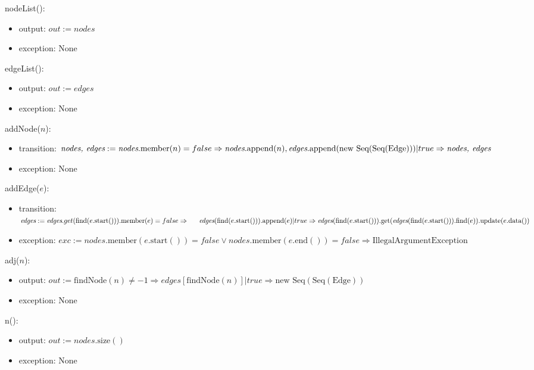 \documentclass[12pt]{article}
\begin{document}
\noindent nodeList():
\begin{itemize}
	\item output: $out := \textit{nodes}$
	\item exception: None
\end{itemize}

\noindent edgeList():
\begin{itemize}
	\item output: $out := \textit{edges}$
	\item exception: None
\end{itemize}

\noindent addNode($n$):
\begin{itemize}
	\item transition: $\textit{nodes, edges} := \textit{nodes}.\mbox{member}(n) = false \Rightarrow \textit{nodes}.\mbox{append}(n), \\ \textit{edges}.\mbox{append}(\mbox{new Seq}(\mbox{Seq}(\mbox{Edge}))) | true \Rightarrow \textit{nodes, edges}$
	\item exception: None
\end{itemize}

\noindent addEdge($e$):
\begin{itemize}
	\item transition: $\textit{edges} := \textit{edges}.get(\mbox{find}(e.\mbox{start}())).\mbox{member}(e) = false \Rightarrow \\
	\indent \textit{edges}(\mbox{find}(e.\mbox{start}())).\mbox{append}(e) |\\
	true \Rightarrow \textit{edges}(\mbox{find}(e.\mbox{start}())).\mbox{get}(\textit{edges}(\mbox{find}(e.\mbox{start}())).\mbox{find}(e)).\mbox{update}(e.\mbox{data}())
	$
	\item exception: $exc := \textit{nodes}.\mbox{member}(e.\mbox{start}()) = false \lor \textit{nodes}.\mbox{member}(e.\mbox{end}()) = false \Rightarrow \text{IllegalArgumentException}$
\end{itemize}

\noindent adj($n$):
\begin{itemize}
	\item output: $out := \mbox{findNode}(n) \neq -1 \Rightarrow \textit{edges}[\mbox{findNode}(n)] | true \Rightarrow \mbox{new Seq}(\mbox{Seq}(\mbox{Edge}))$
	\item exception: None
\end{itemize}

\noindent n():
\begin{itemize}
	\item output: $out := \textit{nodes}.\mbox{size}()$
	\item exception: None
\end{itemize}
\end{document}
